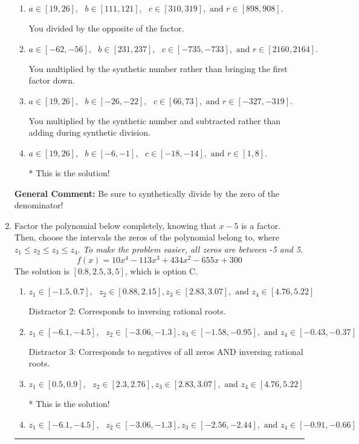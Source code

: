 \documentclass{extbook}[14pt]
\newcommand{\litem}[1]{\item #1

\rule{\textwidth}{0.4pt}}
\begin{document}
\begin{enumerate}
{\begin{enumerate}[label=\Alph*.]
 You divided by the opposite of the factor AND multiplied the first factor rather than just bringing it down.
\item \( a \in [19, 26], \text{   } b \in [111, 121], \text{   } c \in [310, 319], \text{   and   } r \in [898, 908]. \)

 You divided by the opposite of the factor.
\item \( a \in [-62, -56], \text{   } b \in [231, 237], \text{   } c \in [-735, -733], \text{   and   } r \in [2160, 2164]. \)

 You multiplied by the synthetic number rather than bringing the first factor down.
\item \( a \in [19, 26], \text{   } b \in [-26, -22], \text{   } c \in [66, 73], \text{   and   } r \in [-327, -319]. \)

 You multiplied by the synthetic number and subtracted rather than adding during synthetic division.
\item \( a \in [19, 26], \text{   } b \in [-6, -1], \text{   } c \in [-18, -14], \text{   and   } r \in [1, 8]. \)

* This is the solution!
\end{enumerate}

\textbf{General Comment:} Be sure to synthetically divide by the zero of the denominator!
}
\litem{
Factor the polynomial below completely, knowing that $x -5$ is a factor. Then, choose the intervals the zeros of the polynomial belong to, where $z_1 \leq z_2 \leq z_3 \leq z_4$. \textit{To make the problem easier, all zeros are between -5 and 5.}
\[ f(x) = 10x^{4} -113 x^{3} +434 x^{2} -655 x + 300 \]The solution is \( [0.8, 2.5, 3, 5] \), which is option C.\begin{enumerate}[label=\Alph*.]
\item \( z_1 \in [-1.5, 0.7], \text{   }  z_2 \in [0.88, 2.15], z_3 \in [2.83, 3.07], \text{   and   } z_4 \in [4.76, 5.22] \)

 Distractor 2: Corresponds to inversing rational roots.
\item \( z_1 \in [-6.1, -4.5], \text{   }  z_2 \in [-3.06, -1.3], z_3 \in [-1.58, -0.95], \text{   and   } z_4 \in [-0.43, -0.37] \)

 Distractor 3: Corresponds to negatives of all zeros AND inversing rational roots.
\item \( z_1 \in [0.5, 0.9], \text{   }  z_2 \in [2.3, 2.76], z_3 \in [2.83, 3.07], \text{   and   } z_4 \in [4.76, 5.22] \)

* This is the solution!
\item \( z_1 \in [-6.1, -4.5], \text{   }  z_2 \in [-3.06, -1.3], z_3 \in [-2.56, -2.44], \text{   and   } z_4 \in [-0.91, -0.66] \)


\end{enumerate}}
\end{enumerate}
\end{document}
